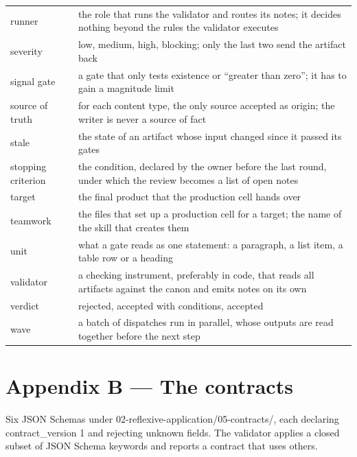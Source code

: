 \documentclass[
  american,
  10pt,
]{report}
\renewcommand{\texttt}[1]{{\ttfamily\hyphenchar\font=-1 #1}}
\begin{document}
{\begin{longtable}[]{@{}
  >{\raggedright\arraybackslash}p{}
  >{\raggedright\arraybackslash}p{}@{}}
runner & the role that runs the validator and routes its notes; it
decides nothing beyond the rules the validator executes \\
severity & \texttt{low}, \texttt{medium}, \texttt{high},
\texttt{blocking}; only the last two send the artifact back \\
signal gate & a gate that only tests existence or ``greater than zero'';
it has to gain a magnitude limit \\
source of truth & for each content type, the only source accepted as
origin; the writer is never a source of fact \\
stale & the state of an artifact whose input changed since it passed its
gates \\
stopping criterion & the condition, declared by the owner before the
last round, under which the review becomes a list of open notes \\
target & the final product that the production cell hands over \\
teamwork & the files that set up a production cell for a target; the
name of the skill that creates them \\
unit & what a gate reads as one statement: a paragraph, a list item, a
table row or a heading \\
validator & a checking instrument, preferably in code, that reads all
artifacts against the canon and emits notes on its own \\
verdict & \texttt{rejected}, \texttt{accepted with conditions},
\texttt{accepted} \\
wave & a batch of dispatches run in parallel, whose outputs are read
together before the next step \\
\end{longtable}
}

\chapter*{Appendix B --- The contracts}\label{appendix-b-the-contracts}

Six JSON Schemas under
\texttt{02-\allowbreak{}reflexive-\allowbreak{}application/\allowbreak{}05-\allowbreak{}contracts/\allowbreak{}},
each declaring \texttt{contract\_\allowbreak{}version} \texttt{1} and
rejecting unknown fields. The validator applies a closed subset of JSON
Schema keywords and reports a contract that uses others.
\end{document}
